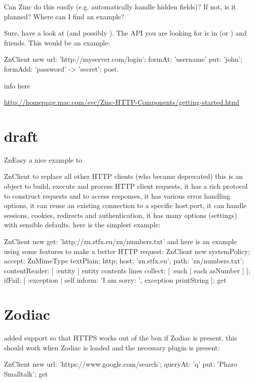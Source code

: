 \documentclass[a4paper,10pt,twoside]{book}
\begin{document}
Can Zinc do this easily (e.g. automatically handle hidden fields)? If not, is
it planned? Where can I find an example?

Sure, have a look at  (and possibly ).
The API you are looking for is in  (or ) and friends.
This would be an example:

\begin{code}{}
ZnClient new
	url: 'http://myserver.com/login';
	formAt: 'username' put: 'john';
	formAdd: 'password' -> 'secret';
	post.
\end{code}

info here

\url{http://homepage.mac.com/svc/Zinc-HTTP-Components/getting-started.html}


\section{draft}
ZnEasy a nice example to 

 ZnClient to replace all other HTTP clients (who became deprecated) this is an object to build, execute and process HTTP client requests,
it has a rich protocol to construct requests and to access responses, it has various error handling options, it can reuse an existing connection to a specific host:port, it can handle sessions, cookies, redirects and authentication, it has many options (settings) with sensible defaults.
here is the simplest example:




\begin{code}
    ZnClient new
      get: 'http://zn.stfx.eu/zn/numbers.txt'
and here is an example using some features to make a better HTTP request:
    ZnClient new
      systemPolicy;
      accept: ZnMimeType textPlain;
      http;
      host: 'zn.stfx.eu';
      path: 'zn/numbers.txt';
      contentReader: [ :entity | entity contents lines collect: [ :each | each asNumber ] ];
      ifFail: [ :exception | self inform: 'I am sorry: ', exception printString ];
      get
\end{code}      


\section{Zodiac}      
 added support so that HTTPS works out of the box if Zodiac is present.
this should work when Zodiac is loaded and the necessary plugin is present:
\begin{code}
    ZnClient new
      url: 'https://www.google.com/search';
      queryAt: 'q' put: 'Pharo Smalltalk';
      get
\end{code}      
      
\end{document}

